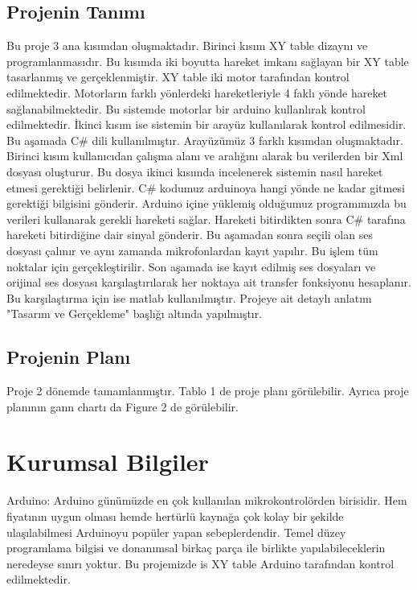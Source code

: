 \documentclass[a4paper, 12pt, titlepage]{article}
\begin{document}
\subsection{Projenin Tanımı}
Bu proje 3 ana kısımdan oluşmaktadır. Birinci kısım XY table dizaynı ve programlanmasıdır. Bu kısımda iki boyutta hareket imkanı sağlayan bir XY table tasarlanmış ve gerçeklenmiştir. XY table iki motor tarafından kontrol edilmektedir. Motorların farklı yönlerdeki hareketleriyle 4 faklı yönde hareket sağlanabilmektedir. Bu sistemde motorlar bir arduino kullanlırak kontrol edilmektedir.
İkinci kısım ise sistemin bir arayüz kullanılarak kontrol edilmesidir. Bu aşamada C# dili kullanılmıştır. Arayüzümüz 3 farklı kısımdan oluşmaktadır. Birinci kısım kullanıcıdan çalışma alanı ve aralığını alarak bu verilerden bir Xml dosyası oluşturur. Bu dosya ikinci kısımda incelenerek sistemin nasıl hareket etmesi gerektiği belirlenir. C# kodumuz arduinoya hangi yönde ne kadar gitmesi gerektiği bilgisini gönderir. Arduino içine yüklemiş olduğumuz programımızda bu verileri kullanarak gerekli hareketi sağlar. Hareketi bitirdikten sonra C# tarafına hareketi bitirdiğine dair sinyal gönderir. Bu aşamadan sonra seçili olan ses dosyası çalınır ve aynı zamanda mikrofonlardan kayıt yapılır. Bu işlem tüm noktalar için gerçekleştirilir.
Son aşamada ise kayıt edilmiş ses dosyaları ve orijinal ses dosyası karşılaştırılarak her noktaya ait transfer fonksiyonu hesaplanır. Bu karşılaştırma için ise matlab kullanılmıştır. Projeye ait detaylı anlatım  "Tasarım ve Gerçekleme" başlığı altında yapılmıştır. 

\subsection{Projenin Planı}
Proje 2 dönemde tamamlanmıştır. Tablo 1 de proje planı görülebilir. Ayrıca proje planının gann chartı da Figure 2 de görülebilir. 

\newpage
\section{Kurumsal Bilgiler}
Arduino: Arduino günümüzde en çok kullanılan mikrokontrolörden birisidir. Hem fiyatının uygun olması hemde hertürlü kaynağa çok kolay bir şekilde ulaşılabilmesi Arduinoyu popüler yapan sebeplerdendir. Temel düzey programlama bilgisi ve donanımsal birkaç parça ile birlikte yapılabileceklerin neredeyse sınırı yoktur. Bu projemizde is XY table Arduino tarafından kontrol edilmektedir.
\end{document}

